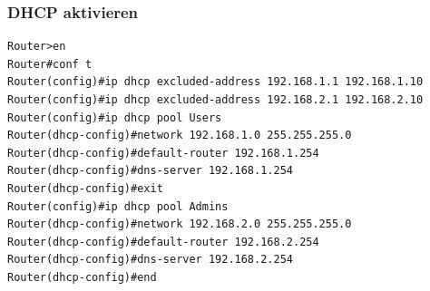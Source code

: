\subsubsection{DHCP aktivieren}
\begin{lstlisting}
Router>en
Router#conf t
Router(config)#ip dhcp excluded-address 192.168.1.1 192.168.1.10
Router(config)#ip dhcp excluded-address 192.168.2.1 192.168.2.10
Router(config)#ip dhcp pool Users
Router(dhcp-config)#network 192.168.1.0 255.255.255.0
Router(dhcp-config)#default-router 192.168.1.254
Router(dhcp-config)#dns-server 192.168.1.254
Router(dhcp-config)#exit
Router(config)#ip dhcp pool Admins
Router(dhcp-config)#network 192.168.2.0 255.255.255.0
Router(dhcp-config)#default-router 192.168.2.254
Router(dhcp-config)#dns-server 192.168.2.254
Router(dhcp-config)#end
\end{lstlisting}
